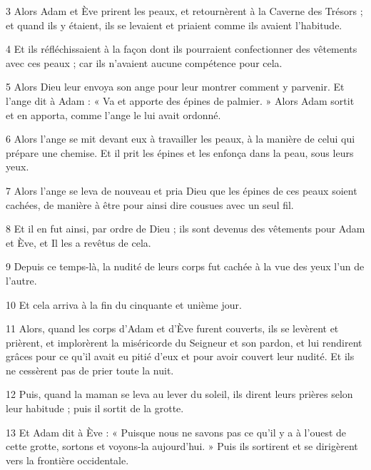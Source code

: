 \par 3 Alors Adam et Ève prirent les peaux, et retournèrent à la Caverne des Trésors ; et quand ils y étaient, ils se levaient et priaient comme ils avaient l'habitude.

\par 4 Et ils réfléchissaient à la façon dont ils pourraient confectionner des vêtements avec ces peaux ; car ils n’avaient aucune compétence pour cela.

\par 5 Alors Dieu leur envoya son ange pour leur montrer comment y parvenir. Et l'ange dit à Adam : « Va et apporte des épines de palmier. » Alors Adam sortit et en apporta, comme l'ange le lui avait ordonné.

\par 6 Alors l'ange se mit devant eux à travailler les peaux, à la manière de celui qui prépare une chemise. Et il prit les épines et les enfonça dans la peau, sous leurs yeux.

\par 7 Alors l'ange se leva de nouveau et pria Dieu que les épines de ces peaux soient cachées, de manière à être pour ainsi dire cousues avec un seul fil.

\par 8 Et il en fut ainsi, par ordre de Dieu ; ils sont devenus des vêtements pour Adam et Ève, et Il les a revêtus de cela.

\par 9 Depuis ce temps-là, la nudité de leurs corps fut cachée à la vue des yeux l'un de l'autre.

\par 10 Et cela arriva à la fin du cinquante et unième jour.

\par 11 Alors, quand les corps d'Adam et d'Ève furent couverts, ils se levèrent et prièrent, et implorèrent la miséricorde du Seigneur et son pardon, et lui rendirent grâces pour ce qu'il avait eu pitié d'eux et pour avoir couvert leur nudité. Et ils ne cessèrent pas de prier toute la nuit.

\par 12 Puis, quand la maman se leva au lever du soleil, ils dirent leurs prières selon leur habitude ; puis il sortit de la grotte.

\par 13 Et Adam dit à Ève : « Puisque nous ne savons pas ce qu'il y a à l'ouest de cette grotte, sortons et voyons-la aujourd'hui. » Puis ils sortirent et se dirigèrent vers la frontière occidentale.




